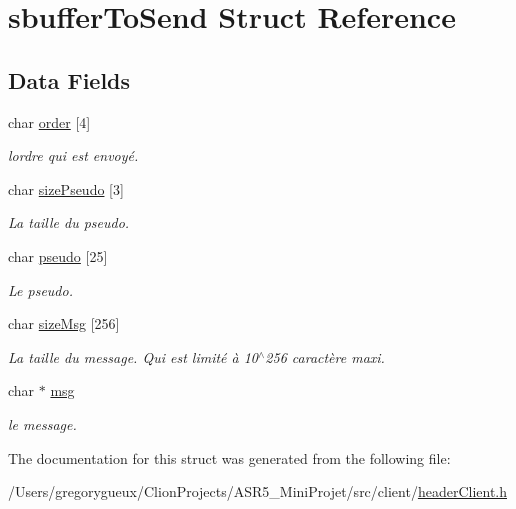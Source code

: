 \hypertarget{structsbuffer_to_send}{}\section{sbuffer\+To\+Send Struct Reference}
\label{structsbuffer_to_send}
\subsection*{Data Fields}
\begin{DoxyCompactItemize}
\item 
\hypertarget{group__client_ga907c3a6256dd10a071ee545d4249825a}{}char \hyperlink{group__client_ga907c3a6256dd10a071ee545d4249825a}{order} \mbox{[}4\mbox{]}\label{group__client_ga907c3a6256dd10a071ee545d4249825a}

\begin{DoxyCompactList}\small\item\em l\textquotesingle{}ordre qui est envoyé. \end{DoxyCompactList}\item 
\hypertarget{group__client_ga076b5d65b30fabbb37beeb44450a5698}{}char \hyperlink{group__client_ga076b5d65b30fabbb37beeb44450a5698}{size\+Pseudo} \mbox{[}3\mbox{]}\label{group__client_ga076b5d65b30fabbb37beeb44450a5698}

\begin{DoxyCompactList}\small\item\em La taille du pseudo. \end{DoxyCompactList}\item 
\hypertarget{group__client_gae6cc99604162931ab8baf652f1a03682}{}char \hyperlink{group__client_gae6cc99604162931ab8baf652f1a03682}{pseudo} \mbox{[}25\mbox{]}\label{group__client_gae6cc99604162931ab8baf652f1a03682}

\begin{DoxyCompactList}\small\item\em Le pseudo. \end{DoxyCompactList}\item 
\hypertarget{group__client_ga86a8c1c1cd8fa6d69fa7558e34f915cf}{}char \hyperlink{group__client_ga86a8c1c1cd8fa6d69fa7558e34f915cf}{size\+Msg} \mbox{[}256\mbox{]}\label{group__client_ga86a8c1c1cd8fa6d69fa7558e34f915cf}

\begin{DoxyCompactList}\small\item\em La taille du message. Qui est limité à 10$^\wedge$256 caractère maxi. \end{DoxyCompactList}\item 
\hypertarget{group__client_ga32d2f5216cddb59c7cc8fb2806a7e727}{}char $\ast$ \hyperlink{group__client_ga32d2f5216cddb59c7cc8fb2806a7e727}{msg}\label{group__client_ga32d2f5216cddb59c7cc8fb2806a7e727}

\begin{DoxyCompactList}\small\item\em le message. \end{DoxyCompactList}\end{DoxyCompactItemize}


The documentation for this struct was generated from the following file\+:\begin{DoxyCompactItemize}
\item 
/\+Users/gregorygueux/\+Clion\+Projects/\+A\+S\+R5\+\_\+\+Mini\+Projet/src/client/\hyperlink{header_client_8h}{header\+Client.\+h}\end{DoxyCompactItemize}
